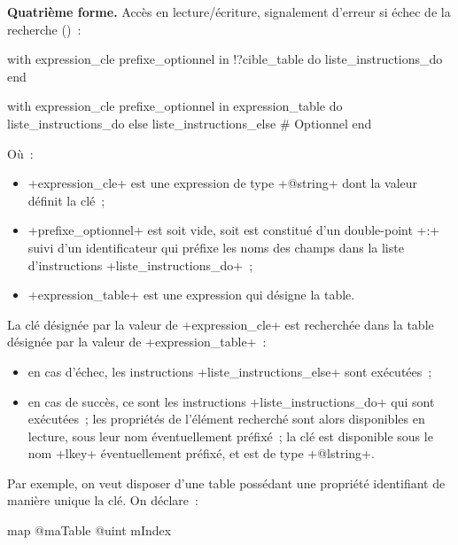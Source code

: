 \textbf{Quatrième forme.} Accès en lecture/écriture, signalement d'erreur si échec de la recherche ()~:
\begin{galgas}
with expression_cle prefixe_optionnel in !?cible_table
do
  liste_instructions_do
end
\end{galgas}






\begin{galgas}
with expression_cle prefixe_optionnel in expression_table
do
  liste_instructions_do
else
  liste_instructions_else # Optionnel
end
\end{galgas}

Où~:
\begin{itemize}
  \item \ggs+expression_cle+ est une expression de type \ggs+@string+ dont la valeur définit la clé~;
  \item \ggs+prefixe_optionnel+ est soit vide, soit est constitué d'un double-point \ggs+:+ suivi d'un identificateur qui préfixe les noms des champs dans la liste d'instructions \ggs+liste_instructions_do+~;
  \item \ggs+expression_table+ est une expression qui désigne la table.
\end{itemize}

La clé désignée par la valeur de \ggs+expression_cle+ est recherchée dans la table désignée par la valeur de \ggs+expression_table+~:
\begin{itemize}
  \item en cas d'échec, les instructions \ggs+liste_instructions_else+ sont exécutées~;
  \item en cas de succès, ce sont les instructions \ggs+liste_instructions_do+ qui sont exécutées~; les propriétés de l'élément recherché sont alors disponibles en lecture, sous leur nom éventuellement préfixé~; la clé est disponible sous le nom \ggs+lkey+ éventuellement préfixé, et est de type \ggs+@lstring+.
\end{itemize}



Par exemple, on veut disposer d'une table possédant une propriété identifiant de manière unique la clé. On déclare~:
\begin{galgas}
map @maTable {
  @uint mIndex
}
\end{galgas}

